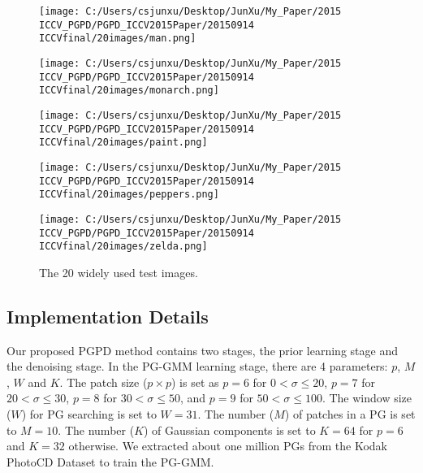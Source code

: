 \begin{figure}[t]
{\begin{minipage}{0.042\textwidth}
\end{minipage}
\begin{minipage}{0.042\textwidth}
\texttt{[image: C:/Users/csjunxu/Desktop/JunXu/My\_Paper/2015 ICCV\_PGPD/PGPD\_ICCV2015Paper/20150914 ICCVfinal/20images/man.png]}
\end{minipage}
\begin{minipage}{0.042\textwidth}
\texttt{[image: C:/Users/csjunxu/Desktop/JunXu/My\_Paper/2015 ICCV\_PGPD/PGPD\_ICCV2015Paper/20150914 ICCVfinal/20images/monarch.png]}
\end{minipage}
\begin{minipage}{0.042\textwidth}
\texttt{[image: C:/Users/csjunxu/Desktop/JunXu/My\_Paper/2015 ICCV\_PGPD/PGPD\_ICCV2015Paper/20150914 ICCVfinal/20images/paint.png]}
\end{minipage}
\begin{minipage}{0.042\textwidth}
\texttt{[image: C:/Users/csjunxu/Desktop/JunXu/My\_Paper/2015 ICCV\_PGPD/PGPD\_ICCV2015Paper/20150914 ICCVfinal/20images/peppers.png]}
\end{minipage}
\begin{minipage}{0.042\textwidth}
\texttt{[image: C:/Users/csjunxu/Desktop/JunXu/My\_Paper/2015 ICCV\_PGPD/PGPD\_ICCV2015Paper/20150914 ICCVfinal/20images/zelda.png]}
\end{minipage}
}
\vspace{-0.1in}
\caption{The 20 widely used test images.}
\vspace{-0.25in}
\label{fig5}
\end{figure}
\vspace{-0.1in}
\subsection{Implementation Details}
Our proposed PGPD method contains two stages, the prior learning stage and the denoising stage. In the PG-GMM learning stage, there are 4 parameters: $p$, $M$, $W$ and $K$. The patch size ($p\times p$) is set as $p = 6$ for $0 < \sigma \le 20$, $p = 7$ for $20 < \sigma \le 30$, $p = 8$ for $30 < \sigma \le 50$, and $p=9$ for $50 < \sigma \le 100$. The window size ($W$) for PG searching is set to $W = 31$. The number ($M$) of patches in a PG is set to $M=10$. The number ($K$) of Gaussian components is set to $K=64$ for $p=6$ and $K=32$ otherwise. We extracted about one million PGs from the Kodak PhotoCD Dataset to train the PG-GMM. 

